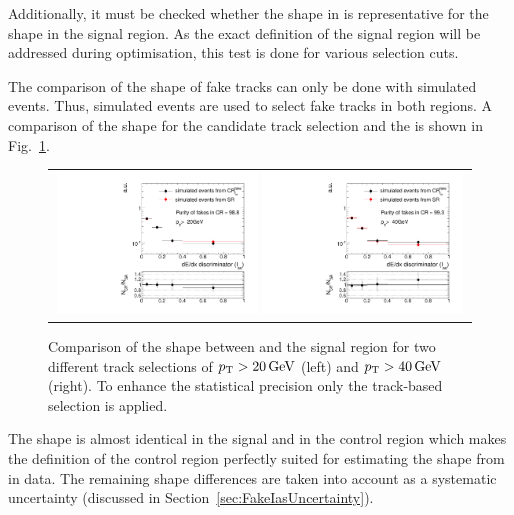 Additionally, it must be checked whether the \ias shape in \fakeCR is representative for the \ias shape in the signal region.
As the exact definition of the signal region will be addressed during optimisation, this test is done for various \pt selection cuts.

The comparison of the \ias shape of fake tracks can only be done with simulated events.
Thus, simulated \WJets events are used to select fake tracks in both regions.
A comparison of the shape for the candidate track selection and the \fakeCR is shown in Fig.~\ref{fig:IasSRCRFakes}.
\begin{figure}[!h]
  \centering 
  \begin{tabular}{c}
    \includegraphics[width=0.49\textwidth]{figures/analysis/Background/hASmi_fakes_ECalaoLe5_trackPtGt20.pdf}
    \includegraphics[width=0.49\textwidth]{figures/analysis/Background/hASmi_fakes_ECalaoLe5_trackPtGt40.pdf}
  \end{tabular}
  \caption{Comparison of the \ias shape between \fakeCR and the signal region for two different track \pt selections of $p_{\text{T}}>20\,\text{Ge}\kern-0.06667em\text{V}$ (left) and $p_{\text{T}}>40\,\text{Ge}\kern-0.06667em\text{V}$ (right). 
           To enhance the statistical precision only the track-based selection is applied.}
  \label{fig:IasSRCRFakes}
\end{figure}

The \ias shape is almost identical in the signal and in the control region which makes the definition of the control region perfectly suited for estimating the \ias shape from \fakeCR in data.
The remaining shape differences are taken into account as a systematic uncertainty (discussed in Section~\ref{sec:FakeIasUncertainty}).
\FloatBarrier
